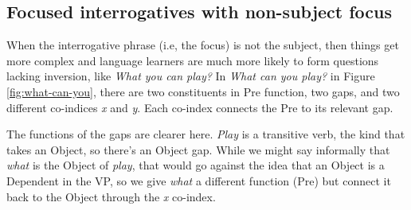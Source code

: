\subsection{Focused interrogatives with non-subject focus}

When the interrogative phrase (i.e, the focus) is not the subject, then things get more complex and language learners are much more likely to form questions lacking inversion, like \textit{What you can play?} In \textit{What can you play?} in Figure \ref{fig:what-can-you}, there are two constituents in \textsf{Pre} function, two gaps, and two different co-indices \textit{x} and \textit{y}. Each co-index connects the \textsf{Pre} to its relevant gap. 

The functions of the gaps are clearer here. \textit{Play} is a transitive verb, the kind that takes an \textsf{Object}, so there's an \textsf{Object} gap. While we might say informally that \textit{what} is the \textsf{Object} of \textit{play}, that would go against the idea that an \textsf{Object} is a \textsf{Dependent} in the VP, so we give \textit{what} a different function (\textsf{Pre}) but connect it back to the \textsf{Object} through the \textit{x} co-index.
